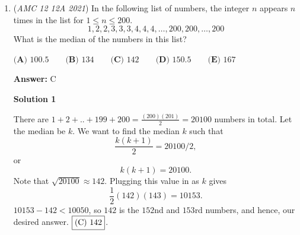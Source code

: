 \begin{enumerate}
 We now evaluate the four terms.

 For $j=0$,

 
 \[(1+1)^6(1+1)^8=2^{14}=16384.\]

 For $j=2$,

 
 \[(1-1)^6(1-1)^8=0.\]

 For $j=1$, since $(1+i)^2=2i$ and $(1-i)^2=-2i$,

 
 \[(1+i)^6(1-i)^8=(2i)^3(-2i)^4=-128i.\]

 For $j=3$, the term is the complex conjugate of the preceding term, so it equals $128i$.

 Therefore,

 
 \[N+1=\frac14(16384-128i+0+128i)=4096.\]

 Subtracting the empty group,

 
 \[N=4096-1=4095.\]

 Hence the last two digits are

 
 \[\boxed{95}.\]

 The answer is $\boxed{\textbf{(D)}}$.

 More generally, for a primitive $m$th root of unity $\omega=e^{2\pi i/m}$, we have

 
 \[\frac1m\sum_{j=0}^{m-1}\omega^{jk}=\begin{cases}1 & \text{if }k\equiv0\pmod m,\\0 & \text{otherwise}.\end{cases}\]

 This roots-of-unity filter allows modular restrictions in combinatorial sums to be handled algebraically.

 


	\item (\textit{AMC 12 12A 2021}) In the following list of numbers, the integer $n$ appears $n$ times in the list for $1\le n \le 200$.
 \[1,2,2,3,3,3,4,4,4,\ldots,200,200,\ldots,200\]What is the median of the numbers in this list?


 $\textbf{(A) }100.5 \qquad \textbf{(B) }134 \qquad \textbf{(C) }142 \qquad \textbf{(D) }150.5\qquad \textbf{(E) }167$

 \textbf{Answer: }C



\textbf{Solution 1}

There are $1+2+..+199+200=\frac{(200)(201)}{2}=20100$ numbers in total. Let the median be $k$. We want to find the median $k$ such that
 \[\frac{k(k+1)}{2}=20100/2,\]or
 \[k(k+1)=20100.\]Note that $\sqrt{20100} \approx 142$. Plugging this value in as $k$ gives
 \[\frac{1}{2}(142)(143)=10153.\]$10153-142<10050$, so $142$ is the $152$nd and $153$rd numbers, and hence, our desired answer. $\fbox{(C) 142}$.


\end{enumerate}
